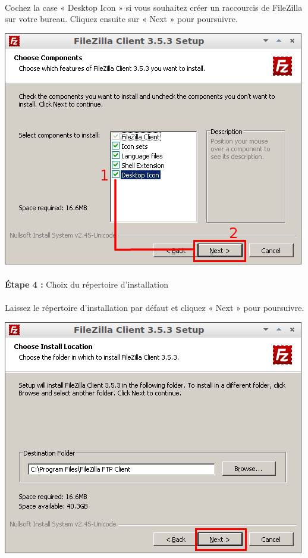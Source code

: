 \documentclass[10pt,a4paper]{article}
\begin{document}
\paragraph{}Cochez la case « Desktop Icon » si vous souhaitez créer un raccourcis de FileZilla sur votre bureau. Cliquez ensuite sur « Next » pour poursuivre.
\begin{center}
\includegraphics[scale=0.5]{img/0018.png}
\end{center}
\paragraph{}\textbf{Étape 4 : }Choix du répertoire d'installation
\paragraph{}Laissez le répertoire d'installation par défaut et cliquez « Next » pour poursuivre.
\begin{center}
\includegraphics[scale=0.5]{img/0019.png}
\end{center}
\end{document}
